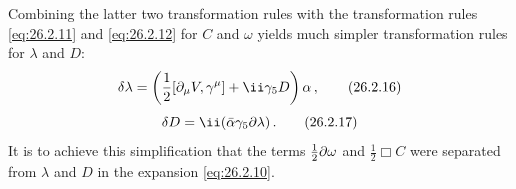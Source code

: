Combining the latter two transformation rules with the transformation rules
\eqref{eq:26.2.11} and \eqref{eq:26.2.12} for $C$ and $\omega$ yields much
simpler transformation rules for $\lambda$ and $D$:
\begin{equation}
  \delta\lambda
  =\left(\frac12[\partial_\mu\sl{V},\gamma^\mu]
    +\ii\gamma_5D\right)\alpha\,,
  \tag{26.2.16}\label{eq:26.2.16}
\end{equation}
\begin{equation}
  \delta D=\ii(\bar\alpha\gamma_5\sl{\partial}\lambda)\,.
  \tag{26.2.17}\label{eq:26.2.17}
\end{equation}
It is to achieve this simplification that the terms
$\frac12\sl{\partial}\omega$ and $\frac12\Box C$ were separated from
$\lambda$ and $D$ in the expansion \eqref{eq:26.2.10}.

